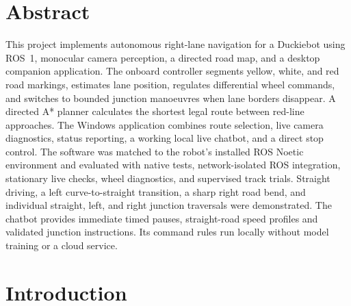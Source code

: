 \documentclass[10pt,a4paper,twocolumn]{article}
\begin{document}

\section{Abstract}

This project implements autonomous right-lane navigation for a Duckiebot using
ROS~1, monocular camera perception, a directed road map, and a desktop companion
application. The onboard controller segments yellow, white, and red road
markings, estimates lane position, regulates differential wheel commands, and
switches to bounded junction manoeuvres when lane borders disappear. A directed
A* planner calculates the shortest legal route between red-line approaches.
The Windows application combines route selection, live camera diagnostics,
status reporting, a working local live chatbot, and a direct stop control. The software was matched to the
robot's installed ROS Noetic environment and evaluated with native tests,
network-isolated ROS integration, stationary live checks, wheel diagnostics,
and supervised track trials. Straight driving, a left curve-to-straight
transition, a sharp right road bend, and individual straight, left, and right
junction traversals were demonstrated. The chatbot provides immediate timed pauses, straight-road speed profiles and
validated junction instructions. Its command rules run locally without model
training or a cloud service.

\section{Introduction}
\end{document}
